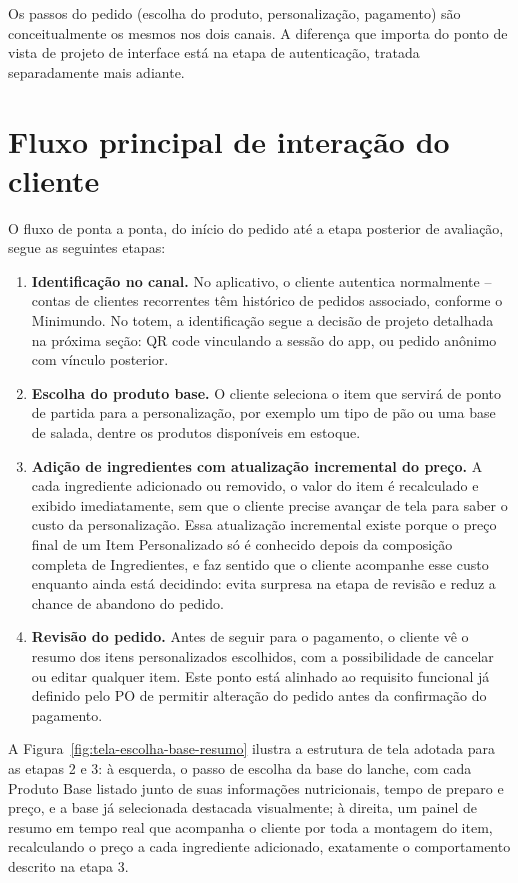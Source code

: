 \documentclass[a4paper,12pt,oneside,openany]{book}
\begin{document}
Os passos do pedido (escolha do produto, personalização, pagamento) são conceitualmente os mesmos nos dois canais. A diferença que importa do ponto de vista de projeto de interface está na etapa de autenticação, tratada separadamente mais adiante.

\section{Fluxo principal de interação do cliente}

O fluxo de ponta a ponta, do início do pedido até a etapa posterior de avaliação, segue as seguintes etapas:

\begin{enumerate}
    \item \textbf{Identificação no canal.} No aplicativo, o cliente autentica normalmente -- contas de clientes recorrentes têm histórico de pedidos associado, conforme o Minimundo. No totem, a identificação segue a decisão de projeto detalhada na próxima seção: QR code vinculando a sessão do app, ou pedido anônimo com vínculo posterior.
    \item \textbf{Escolha do produto base.} O cliente seleciona o item que servirá de ponto de partida para a personalização, por exemplo um tipo de pão ou uma base de salada, dentre os produtos disponíveis em estoque.
    \item \textbf{Adição de ingredientes com atualização incremental do preço.} A cada ingrediente adicionado ou removido, o valor do item é recalculado e exibido imediatamente, sem que o cliente precise avançar de tela para saber o custo da personalização. Essa atualização incremental existe porque o preço final de um Item Personalizado só é conhecido depois da composição completa de Ingredientes, e faz sentido que o cliente acompanhe esse custo enquanto ainda está decidindo: evita surpresa na etapa de revisão e reduz a chance de abandono do pedido.
    \item \textbf{Revisão do pedido.} Antes de seguir para o pagamento, o cliente vê o resumo dos itens personalizados escolhidos, com a possibilidade de cancelar ou editar qualquer item. Este ponto está alinhado ao requisito funcional já definido pelo PO de permitir alteração do pedido antes da confirmação do pagamento.
\end{enumerate}

A Figura~\ref{fig:tela-escolha-base-resumo} ilustra a estrutura de tela adotada para as etapas 2 e 3: à esquerda, o passo de escolha da base do lanche, com cada Produto Base listado junto de suas informações nutricionais, tempo de preparo e preço, e a base já selecionada destacada visualmente; à direita, um painel de resumo em tempo real que acompanha o cliente por toda a montagem do item, recalculando o preço a cada ingrediente adicionado, exatamente o comportamento descrito na etapa 3.
\end{document}
